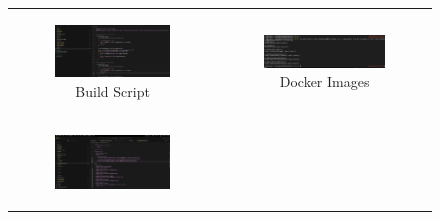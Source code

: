 \begin{figure}[h!]
    \centering
    \begin{adjustbox}{bgcolor=gray!20, padding=0.7em, margin=1ex}
        \begin{tabular}{cc}
            \begin{subfigure}{0.48\textwidth}
                \centering
                \includegraphics[width=\linewidth]{MWP-Project Report Template - BD-ML-June25/screenshots_classic/1_build_script.png}
                \caption{Build Script}
            \end{subfigure} &
            \begin{subfigure}{0.48\textwidth}
                \centering
                \includegraphics[width=\linewidth]{MWP-Project Report Template - BD-ML-June25/screenshots_classic/2_local_docker_registry.png}
                \caption{Docker Images}
            \end{subfigure} \\
            \begin{subfigure}{0.48\textwidth}
                \centering
                \includegraphics[width=\linewidth]{MWP-Project Report Template - BD-ML-June25/screenshots_classic/3_kustomise_depliyment_script.png}

\end{subfigure}
\end{tabular}
\end{adjustbox}
\end{figure}
